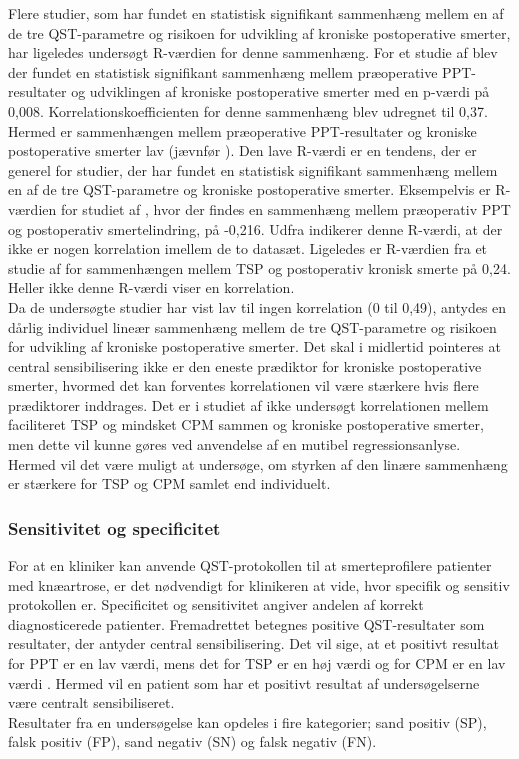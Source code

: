 Flere studier, som har fundet en statistisk signifikant sammenhæng mellem en af de tre QST-parametre og risikoen for udvikling af kroniske postoperative smerter, har ligeledes undersøgt R-værdien for denne sammenhæng. For et studie af  blev der fundet en statistisk signifikant sammenhæng mellem præoperative PPT-resultater og udviklingen af kroniske postoperative smerter med en p-værdi på 0,008. Korrelationskoefficienten for denne sammenhæng blev udregnet til 0,37. Hermed er sammenhængen mellem præoperative PPT-resultater og kroniske postoperative smerter lav (jævnfør ). Den lave R-værdi er en tendens, der er generel for studier, der har fundet en statistisk signifikant sammenhæng mellem en af de tre QST-parametre og kroniske postoperative smerter. Eksempelvis er R-værdien for studiet af , hvor der findes en sammenhæng mellem præoperativ PPT og postoperativ smertelindring, på -0,216. Udfra  indikerer denne R-værdi, at der ikke er nogen korrelation imellem de to datasæt. Ligeledes er R-værdien fra et studie af  for sammenhængen mellem TSP og postoperativ kronisk smerte på 0,24. Heller ikke denne R-værdi viser en korrelation. \\
Da de undersøgte studier har vist lav til ingen korrelation (0 til 0,49), antydes en dårlig individuel lineær sammenhæng mellem de tre QST-parametre og risikoen for udvikling af kroniske postoperative smerter. Det skal i midlertid pointeres at central sensibilisering ikke er den eneste prædiktor for kroniske postoperative smerter, hvormed det kan forventes korrelationen vil være stærkere hvis flere prædiktorer inddrages. Det er i studiet af  ikke undersøgt korrelationen mellem faciliteret TSP og mindsket CPM sammen og kroniske postoperative smerter, men dette vil kunne gøres ved anvendelse af en mutibel regressionsanlyse. \citep{Zar2010} Hermed vil det være muligt at undersøge, om styrken af den linære sammenhæng er stærkere for TSP og CPM samlet end individuelt.

\subsubsection{Sensitivitet og specificitet}
For at en kliniker kan anvende QST-protokollen til at smerteprofilere patienter med knæartrose, er det nødvendigt for klinikeren at vide, hvor specifik og sensitiv protokollen er. Specificitet og sensitivitet angiver andelen af korrekt diagnosticerede patienter. Fremadrettet betegnes positive QST-resultater som resultater, der antyder central sensibilisering. Det vil sige, at et positivt resultat for PPT er en lav værdi, mens det for TSP er en høj værdi og for CPM er en lav værdi \citep{Petersen2016}. Hermed vil en patient som har et positivt resultat af undersøgelserne være centralt sensibiliseret. \\
Resultater fra en undersøgelse kan opdeles i fire kategorier; sand positiv (SP), falsk positiv (FP), sand negativ (SN) og falsk negativ (FN). %

